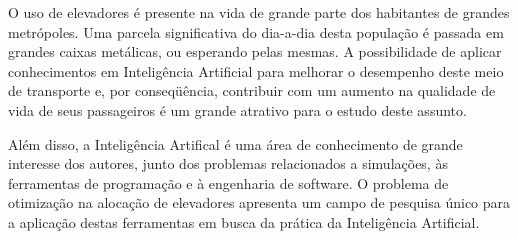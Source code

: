 O uso de elevadores é presente na vida de grande parte dos habitantes de grandes
metrópoles. Uma parcela significativa do dia-a-dia desta população é passada em
grandes caixas metálicas, ou esperando pelas mesmas. A possibilidade de aplicar
conhecimentos em Inteligência Artificial para melhorar o desempenho deste meio
de transporte e, por conseqüência, contribuir com um aumento na qualidade de
vida de seus passageiros é um grande atrativo para o estudo deste assunto.

Além disso, a Inteligência Artifical é uma área de conhecimento de grande
interesse dos autores, junto dos problemas relacionados a simulações, às
ferramentas de programação e à engenharia de software. O problema de otimização
na alocação de elevadores apresenta um campo de pesquisa único para a aplicação
destas ferramentas em busca da prática da Inteligência Artificial.

